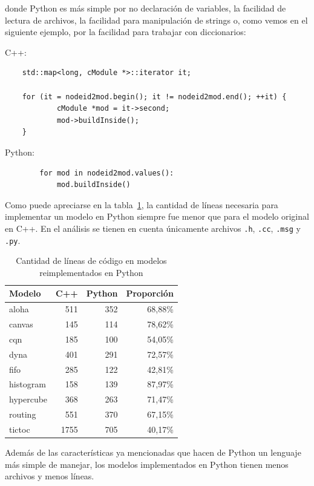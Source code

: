 \documentclass[]{article}
\begin{document}
donde Python es más simple por no declaración de variables, la facilidad de
lectura de archivos, la facilidad para manipulación de strings o, como vemos en
el siguiente ejemplo, por la facilidad para trabajar con diccionarios:

C++:

\begin{verbatim}
    std::map<long, cModule *>::iterator it;

    for (it = nodeid2mod.begin(); it != nodeid2mod.end(); ++it) {
            cModule *mod = it->second;
            mod->buildInside();
    }
\end{verbatim}

Python:

\begin{verbatim}
        for mod in nodeid2mod.values():
            mod.buildInside()
\end{verbatim}

Como puede apreciarse en la tabla~\ref{table:loc}, la cantidad de líneas
necesaria para implementar un modelo en Python siempre fue menor que para el
modelo original en C++.  En el análisis se tienen en cuenta únicamente archivos
\verb!.h!, \verb!.cc!, \verb!.msg! y \verb!.py!.

\begin{table}[h!]
\centering
\begin{tabular}{l|rrr}
Modelo & C++ & Python & Proporción\\
\hline

aloha     & 511  & 352  & 68,88\% \\
canvas    & 145  & 114  & 78,62\% \\
cqn       & 185  & 100  & 54,05\% \\
dyna      & 401  & 291  & 72,57\% \\
fifo      & 285  & 122  & 42,81\% \\
histogram & 158  & 139  & 87,97\% \\
hypercube & 368  & 263  & 71,47\% \\
routing   & 551  & 370  & 67,15\% \\
tictoc    & 1755 & 705  & 40,17\% \\
\end{tabular}
\caption{Cantidad de líneas de código en modelos reimplementados en Python}
\label{table:loc}
\end{table}

Además de las características ya mencionadas que hacen de Python un lenguaje
más simple de manejar, los modelos implementados en Python tienen menos
archivos y menos líneas.
\end{document}
